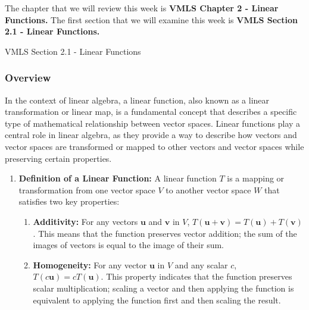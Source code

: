 The chapter that we will review this week is \textbf{VMLS Chapter 2 - Linear Functions.} The first section that we will examine this week is \textbf{VMLS Section 2.1 - Linear Functions.}

\begin{notes}{VMLS Section 2.1 - Linear Functions}
    \subsubsection*{Overview}

    In the context of linear algebra, a linear function, also known as a linear transformation or linear map, is a fundamental concept that describes a specific type of mathematical relationship between 
    vector spaces. Linear functions play a central role in linear algebra, as they provide a way to describe how vectors and vector spaces are transformed or mapped to other vectors and vector spaces while 
    preserving certain properties.
    
    \begin{enumerate}
        \item \textbf{Definition of a Linear Function:} A linear function \(T\) is a mapping or transformation from one vector space \(V\) to another vector space \(W\) that satisfies two key properties:
        \begin{enumerate}
            \item \textbf{Additivity:} For any vectors \(\mathbf{u}\) and \(\mathbf{v}\) in \(V\), \(T(\mathbf{u} + \mathbf{v}) = T(\mathbf{u}) + T(\mathbf{v})\). This means that the function preserves vector 
            addition; the sum of the images of vectors is equal to the image of their sum.
            \item \textbf{Homogeneity:} For any vector \(\mathbf{u}\) in \(V\) and any scalar \(c\), \(T(c\mathbf{u}) = cT(\mathbf{u})\). This property indicates that the function preserves scalar multiplication; 
            scaling a vector and then applying the function is equivalent to applying the function first and then scaling the result.
        \end{enumerate}
        

\end{enumerate}
\end{notes}
